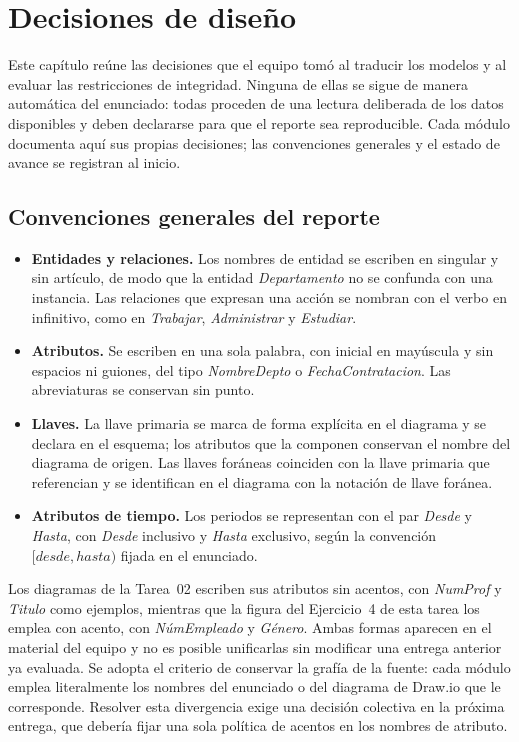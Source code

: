 \section{Decisiones de diseño}

Este capítulo reúne las decisiones que el equipo tomó al traducir los modelos y
al evaluar las restricciones de integridad. Ninguna de ellas se sigue de manera
automática del enunciado: todas proceden de una lectura deliberada de los datos
disponibles y deben declararse para que el reporte sea reproducible. Cada
módulo documenta aquí sus propias decisiones; las convenciones generales y el
estado de avance se registran al inicio.

\subsection{Convenciones generales del reporte}

\begin{itemize}
  \item \textbf{Entidades y relaciones.} Los nombres de entidad se escriben en
        singular y sin artículo, de modo que la entidad \emph{Departamento} no
        se confunda con una instancia. Las relaciones que expresan una acción
        se nombran con el verbo en infinitivo, como en \emph{Trabajar},
        \emph{Administrar} y \emph{Estudiar}.
  \item \textbf{Atributos.} Se escriben en una sola palabra, con inicial en
        mayúscula y sin espacios ni guiones, del tipo \emph{NombreDepto} o
        \emph{FechaContratacion}. Las abreviaturas se conservan sin punto.
  \item \textbf{Llaves.} La llave primaria se marca de forma explícita en el
        diagrama y se declara en el esquema; los atributos que la componen
        conservan el nombre del diagrama de origen. Las llaves foráneas
        coinciden con la llave primaria que referencian y se identifican en el
        diagrama con la notación de llave foránea.
  \item \textbf{Atributos de tiempo.} Los periodos se representan con el par
        \emph{Desde} y \emph{Hasta}, con \emph{Desde} inclusivo y \emph{Hasta}
        exclusivo, según la convención $[desde, hasta)$ fijada en el enunciado.
\end{itemize}

\begin{conceptobox}
Los diagramas de la Tarea~02 escriben sus atributos sin acentos, con
\emph{NumProf} y \emph{Titulo} como ejemplos, mientras que la figura del
Ejercicio~4 de esta tarea los emplea con acento, con \emph{NúmEmpleado} y
\emph{Género}. Ambas formas aparecen en el material del equipo y no es posible
unificarlas sin modificar una entrega anterior ya evaluada. Se adopta el
criterio de conservar la grafía de la fuente: cada módulo emplea literalmente
los nombres del enunciado o del diagrama de Draw.io que le corresponde.
Resolver esta divergencia exige una decisión colectiva en la próxima entrega,
que debería fijar una sola política de acentos en los nombres de atributo.
\end{conceptobox}

